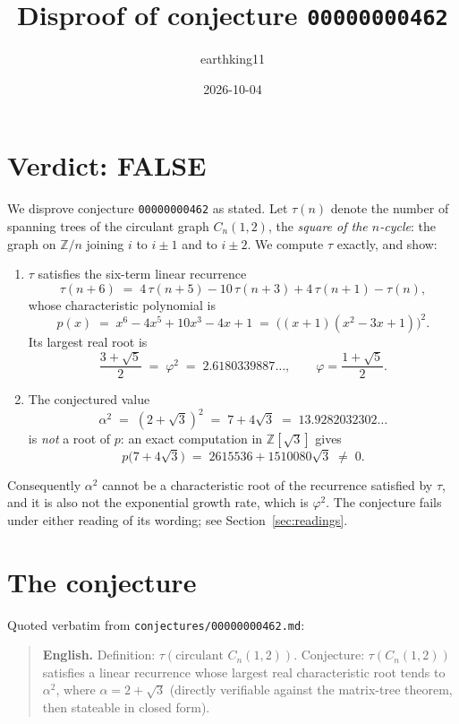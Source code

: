 \documentclass[11pt]{article}
\title{Disproof of conjecture \texttt{00000000462}}
\author{earthking11}
\date{2026-10-04}
\theoremstyle{definition}
\theoremstyle{remark}
\newcommand{\Z}{\mathbb{Z}}
\newcommand{\tauc}{\tau}
\begin{document}
\maketitle

\section*{Verdict: FALSE}

We disprove conjecture \texttt{00000000462} as stated. Let $\tauc(n)$ denote the
number of spanning trees of the circulant graph $C_n(1,2)$, the \emph{square of
the $n$-cycle}: the graph on $\Z/n$ joining $i$ to $i\pm 1$ and to $i\pm 2$. We
compute $\tauc$ exactly, and show:

\begin{enumerate}
\item $\tauc$ satisfies the six-term linear recurrence
\[
\tauc(n+6) \;=\; 4\,\tauc(n+5) - 10\,\tauc(n+3) + 4\,\tauc(n+1) - \tauc(n),
\]
whose characteristic polynomial is
\[
p(x) \;=\; x^{6} - 4x^{5} + 10x^{3} - 4x + 1 \;=\; \bigl((x+1)(x^{2}-3x+1)\bigr)^{2}.
\]
Its largest real root is
\[
\frac{3+\sqrt5}{2} \;=\; \varphi^{2} \;=\; 2.6180339887\ldots,
\qquad \varphi = \frac{1+\sqrt5}{2}.
\]
\item The conjectured value
\[
\alpha^{2} \;=\; (2+\sqrt3)^{2} \;=\; 7 + 4\sqrt3 \;=\; 13.9282032302\ldots
\]
is \emph{not} a root of $p$: an exact computation in $\Z[\sqrt3]$ gives
\[
p\bigl(7+4\sqrt3\bigr) \;=\; 2615536 + 1510080\sqrt3 \;\neq\; 0 .
\]
\end{enumerate}

Consequently $\alpha^{2}$ cannot be a characteristic root of the recurrence
satisfied by $\tauc$, and it is also not the exponential growth rate, which is
$\varphi^{2}$. The conjecture fails under either reading of its wording; see
Section~\ref{sec:readings}.

\section{The conjecture}

Quoted verbatim from \texttt{conjectures/00000000462.md}:

\begin{quote}
\textbf{English.} Definition: $\tauc(\text{circulant } C_n(1,2))$. Conjecture:
$\tauc(C_n(1,2))$ satisfies a linear recurrence whose largest real
characteristic root tends to $\alpha^{2}$, where $\alpha = 2+\sqrt3$ (directly
verifiable against the matrix-tree theorem, then stateable in closed form).
\end{quote}
\end{document}

